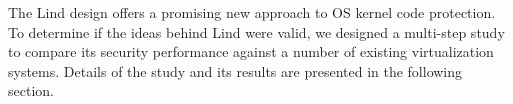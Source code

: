 The Lind design offers a promising new approach to OS kernel code protection. 
To determine if the ideas behind Lind were valid, we 
designed a multi-step study to compare its security performance against a number 
of existing virtualization systems. Details of the study and its results are presented 
in the following section.
